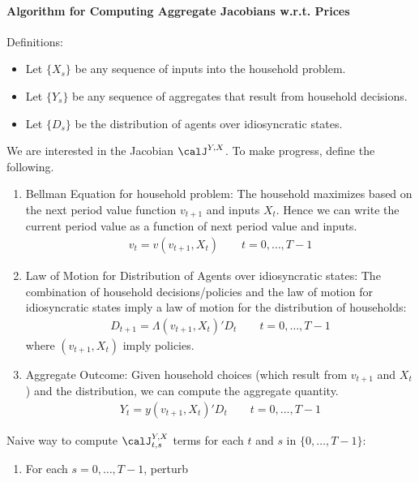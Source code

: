\documentclass[12pt]{article}
\theoremstyle{plain}
\theoremstyle{definition}
\theoremstyle{remark}
\begin{document}
\paragraph{%
  Algorithm for Computing Aggregate Jacobians w.r.t. Prices
}
Definitions:
\begin{itemize}
  \item Let $\{X_s\}$ be any sequence of inputs into the household
    problem.
  \item Let $\{Y_s\}$ be any sequence of aggregates that result from
    household decisions.
  \item Let $\{D_s\}$ be the distribution of agents over idiosyncratic
    states.
\end{itemize}
We are interested in the Jacobian $\calJ^{Y,X}$.
To make progress, define the following.
\begin{enumerate}[label=(\roman*)]
  \item Bellman Equation for household problem:
    The household maximizes based on the next period value function
    $v_{t+1}$ and inputs $X_t$.
    Hence we can write the current period value as a function
    of next period value and inputs.
    \begin{align*}
      v_t = v(v_{t+1},X_t)
      \qquad
      t = 0,\ldots,T-1
    \end{align*}
  \item Law of Motion for Distribution of Agents over idiosyncratic
    states:
    The combination of household decisions/policies and the law of
    motion for idiosyncratic states imply a law of motion for the
    distribution of households:
    \begin{align*}
      D_{t+1} = \Lambda(v_{t+1},X_t)'D_t
      \qquad
      t = 0,\ldots,T-1
    \end{align*}
    where $(v_{t+1},X_t)$ imply policies.

  \item Aggregate Outcome:
    Given household choices (which result from $v_{t+1}$ and $X_t$) and
    the distribution, we can compute the aggregate quantity.
    \begin{align*}
      Y_t = y(v_{t+1},X_t)'D_t
      \qquad
      t = 0,\ldots,T-1
    \end{align*}
\end{enumerate}
Naive way to compute $\calJ^{Y,X}_{t,s}$ terms for each
$t$ and $s$ in $\{0,\ldots,T-1\}$:
\begin{enumerate}
  \item For each $s=0,\ldots,T-1$, perturb
\end{enumerate}
\end{document}
